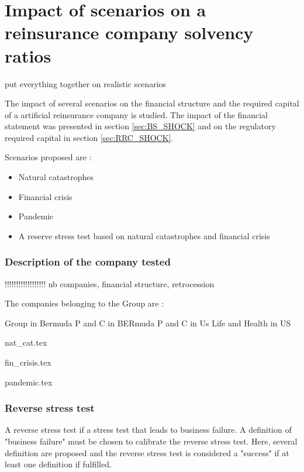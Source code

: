 
\section{Impact of scenarios on a reinsurance company solvency ratios}

put everything together on realistic scenarios


The impact of several scenarios on the financial structure and the required capital of a artificial reinsurance company is studied. The impact of the financial statement was presented in section \ref{sec:BS_SHOCK} and on the regulatory required capital in section \ref{sec:RRC_SHOCK}. 

Scenarios proposed are :
\begin{itemize}
\itemsep0em 
\item Natural catastrophes
\item Financial crisis
\item Pandemic
\item A reserve stress test based on natural catastrophes and financial crisis
\end{itemize}





\subsubsection{Description of the company tested}

!!!!!!!!!!!!!!!!!!
nb companies, financial structure, retrocession

The companies belonging to the Group are :

Group in Bermuda
P and C in BERmuda
P and C in Us 
Life and Health in US



{nat_cat.tex}

{fin_crisis.tex}

{pandemic.tex}


\subsubsection{Reverse stress test}

A reverse stress test if a stress test that leads to business failure. A definition of "business failure" must be chosen to calibrate the reverse stress test. Here, several definition are proposed and the reverse stress test is considered a "success" if at least one definition if fulfilled.

